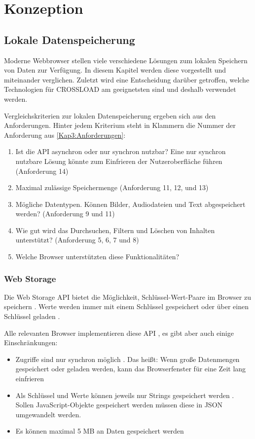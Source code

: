 \chapter{Konzeption}
\label{Kap4}

\section{Lokale Datenspeicherung}
Moderne Webbrowser stellen viele verschiedene Lösungen zum lokalen Speichern von Daten zur Verfügung. In diesem Kapitel werden diese vorgestellt und miteinander verglichen. Zuletzt wird eine Entscheidung darüber getroffen, welche Technologien für CROSSLOAD am geeignetsten sind und deshalb verwendet werden.

Vergleichskriterien zur lokalen Datenspeicherung ergeben sich aus den Anforderungen. Hinter jedem Kriterium steht in Klammern die Nummer der Anforderung aus \autoref{Kap3:Anforderungen}:
\begin{enumerate}
	\item Ist die \ac{API} asynchron oder nur synchron nutzbar? Eine nur synchron nutzbare Lösung könnte zum Einfrieren der Nutzeroberfläche führen (Anforderung 14)
	\item Maximal zulässige Speichermenge (Anforderung 11, 12, und 13)
	\item Mögliche Datentypen. Können Bilder, Audiodateien und Text abgespeichert werden? (Anforderung 9 und 11)
	\item Wie gut wird das Durchsuchen, Filtern und Löschen von Inhalten unterstützt? (Anforderung 5, 6, 7 und 8)
	\item Welche Browser unterstützten diese Funktionalitäten?
\end{enumerate}

\subsection{Web Storage}
Die Web Storage \ac{API} bietet die Möglichkeit, Schlüssel-Wert-Paare im Browser zu speichern \autocite{mdn-web-storage}. Werte werden immer mit einem Schlüssel gespeichert oder über einen Schlüssel geladen \autocite{mdn-web-storage}.

Alle relevanten Browser implementieren diese \ac{API} \autocite{mdn-web-storage}, es gibt aber auch einige Einschränkungen:
\begin{itemize}
	\item Zugriffe sind nur synchron möglich \autocite{Hajian2019}. Das heißt: Wenn große Datenmengen gespeichert oder geladen werden, kann das Browserfenster für eine Zeit lang einfrieren
	\item Als Schlüssel und Werte können jeweils nur Strings gespeichert werden \autocite{Hajian2019}. Sollen JavaScript-Objekte gespeichert werden müssen diese in JSON umgewandelt werden.
	\item Es können maximal 5 \ac{MB} an Daten gespeichert werden \autocite{mdn-web-storage}
\end{itemize}

